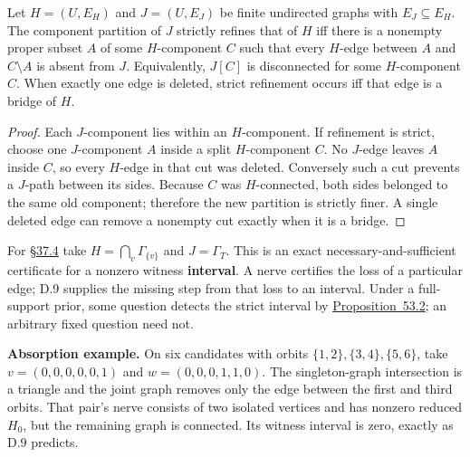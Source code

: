 
\begin{thmplain}

Let \(H=(U,E_H)\) and \(J=(U,E_J)\) be finite undirected graphs with \(E_J\subseteq E_H\). The component partition of \(J\) strictly refines that of \(H\) iff there is a nonempty proper subset \(A\) of some \(H\)-component \(C\) such that every \(H\)-edge between \(A\) and \(C\setminus A\) is absent from \(J\). Equivalently, \(J[C]\) is disconnected for some \(H\)-component \(C\). When exactly one edge is deleted, strict refinement occurs iff that edge is a bridge of \(H\).
\end{thmplain}

\begin{proof}

Each \(J\)-component lies within an \(H\)-component. If refinement is strict, choose one \(J\)-component \(A\) inside a split \(H\)-component \(C\). No \(J\)-edge leaves \(A\) inside \(C\), so every \(H\)-edge in that cut was deleted. Conversely such a cut prevents a \(J\)-path between its sides. Because \(C\) was \(H\)-connected, both sides belonged to the same old component; therefore the new partition is strictly finer. A single deleted edge can remove a nonempty cut exactly when it is a bridge.
\end{proof}

For \hyperlink{sec:37.4}{§37.4} take \(H=\bigcap_v\Gamma_{\{v\}}\) and \(J=\Gamma_T\). This is an exact necessary-and-sufficient certificate for a nonzero witness \textbf{interval}. A nerve certifies the loss of a particular edge; D.9 supplies the missing step from that loss to an interval. Under a full-support prior, some question detects the strict interval by \hyperlink{stmt:53.2}{Proposition~53.2}; an arbitrary fixed question need not.

\textbf{Absorption example.} On six candidates with orbits \(\{1,2\},\{3,4\},\{5,6\}\), take \(v=(0,0,0,0,0,1)\) and \(w=(0,0,0,1,1,0)\). The singleton-graph intersection is a triangle and the joint graph removes only the edge between the first and third orbits. That pair's nerve consists of two isolated vertices and has nonzero reduced \(H_0\), but the remaining graph is connected. Its witness interval is zero, exactly as D.9 predicts.


